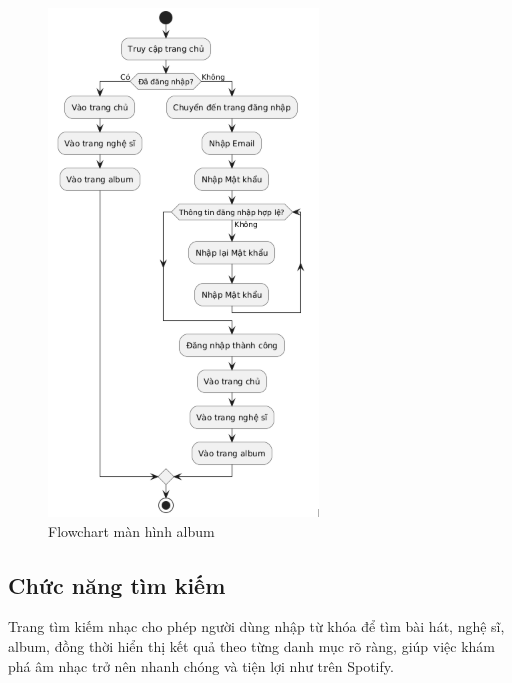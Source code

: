 \begin{figure}
    \centering
    \includegraphics[width=0.8\linewidth]{images/flowchart-album.png}
    \caption{Flowchart màn hình album}
    \label{fig:flowchart-album}
\end{figure}

\subsection{Chức năng tìm kiếm}
\label{subsec:tim-kiem}

Trang tìm kiếm nhạc cho phép người dùng nhập từ khóa để tìm bài hát, nghệ sĩ, album, đồng thời hiển thị kết quả theo từng danh mục rõ ràng, giúp việc khám phá âm nhạc trở nên nhanh chóng và tiện lợi như trên Spotify.

